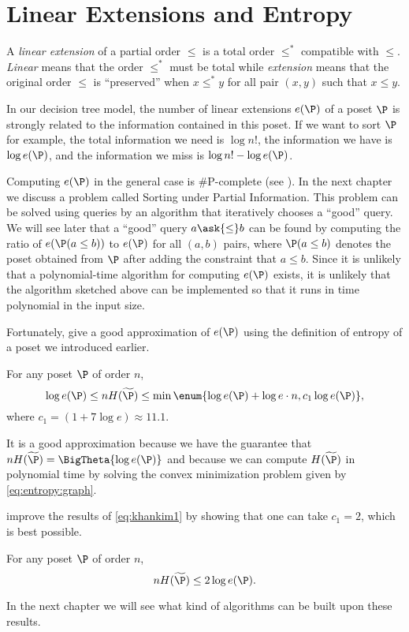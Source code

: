 \section{Linear Extensions and Entropy}

A \emph{linear extension} of a partial order $\leq$ is a total order $\leq^*$
compatible with $\leq$. \emph{Linear} means that the order $\leq^*$ must be
total while \emph{extension} means that the original order $\leq$ is
``preserved'' \ie when \(x \leq^* y\) for all pair \((x,y)\) such that \(x
\leq y\).

In our decision tree model, the number of linear extensions $e(\P)$ of a poset
$\P$ is strongly related to the information contained in this poset. If we
want to sort \(\P\) for example, the
total information we need is $\log n!$, the information we have is $\log e(\P)$,
and the information we miss is $\log n! - \log e(\P)$.

Computing $e(\P)$ in the general case is \#P-complete
(see \citet*{brightwell1991counting}). In the next chapter we discuss a
problem called Sorting under Partial Information. This problem can be solved using \BigO{\ITLB}
queries by an algorithm that
iteratively chooses a ``good'' query. We will see later that a ``good'' query \(a \ask{\le} b\) can be
found by computing the ratio of \(e(\P(a \le b))\) to \(e(\P)\) for all \((a,b)\) pairs, where
\(\P(a \le b)\) denotes the poset obtained
from \(\P\) after adding the constraint that \(a \le b\).
Since it is unlikely that
a polynomial-time algorithm for computing \(e(\P)\) exists, it is unlikely that
the algorithm sketched above
can be implemented so that it runs in time polynomial in the input size.

Fortunately, \citet*{kahn:1995} give a good
approximation of $e(\P)$ using the definition of entropy of a poset we
introduced earlier.
\begin{theorem}
\label{eq:khankim1}
For any poset \(\P\) of order \(n\),
\begin{displaymath}
\log e(\P) \le n H(\widetilde{\P}) \le \min\enum{\log e(\P) + \log e \cdot n, c_1
\log e(\P)},
\end{displaymath}
where \(c_1 = (1 + 7 \log e) \approx 11.1\).
\end{theorem}

It is a good approximation because we have the guarantee that
\(n H(\widetilde{\P}) = \BigTheta{\log e(\P)}\) and because we can compute
\(H(\widetilde{\P})\) in polynomial time by solving the convex minimization
problem given by \ref{eq:entropy:graph}.

\citet*{cardinal:2013} improve the results of \ref{eq:khankim1} by showing that
one can take \(c_1 = 2\), which is best possible.
\begin{theorem}
For any poset \(\P\) of order \(n\),
\begin{displaymath}
n H(\widetilde{\P}) \le 2 \log e(\P).
\end{displaymath}
\end{theorem}

In the next chapter we will see what kind of algorithms can be built upon
these results.
